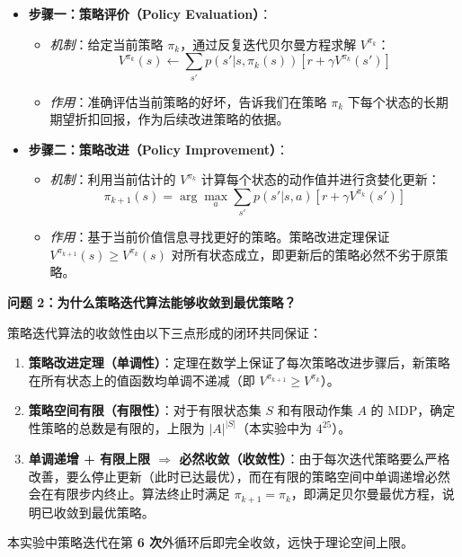 \documentclass[11pt,a4paper,UTF8]{ctexart}
\numberwithin{figure}{section}
\numberwithin{table}{section}
\newcommand{\answerlabel}{%
  \par\smallskip\noindent{\heiti\bfseries 回答：}\quad}
\begin{document}
\begin{itemize}
    \item \textbf{步骤一：策略评价（Policy Evaluation）}：
    \begin{itemize}
        \item \textit{机制}：给定当前策略 $\pi_k$，通过反复迭代贝尔曼方程求解 $V^{\pi_k}$：
        $$V^{\pi_k}(s) \leftarrow \sum_{s'} p(s'|s,\pi_k(s))[r + \gamma V^{\pi_k}(s')]$$
        \item \textit{作用}：准确评估当前策略的好坏，告诉我们在策略 $\pi_k$ 下每个状态的长期期望折扣回报，作为后续改进策略的依据。
    \end{itemize}
    \item \textbf{步骤二：策略改进（Policy Improvement）}：
    \begin{itemize}
        \item \textit{机制}：利用当前估计的 $V^{\pi_k}$ 计算每个状态的动作值并进行贪婪化更新：
        $$\pi_{k+1}(s) = \arg\max_a \sum_{s'} p(s'|s,a)[r + \gamma V^{\pi_k}(s')]$$
        \item \textit{作用}：基于当前价值信息寻找更好的策略。策略改进定理保证 $V^{\pi_{k+1}}(s) \geq V^{\pi_k}(s)$ 对所有状态成立，即更新后的策略必然不劣于原策略。
    \end{itemize}
\end{itemize}


\textbf{问题 2：为什么策略迭代算法能够收敛到最优策略？}


\answerlabel 

策略迭代算法的收敛性由以下三点形成的闭环共同保证：

\begin{enumerate}
    \item \textbf{策略改进定理（单调性）}：定理在数学上保证了每次策略改进步骤后，新策略在所有状态上的值函数均单调不递减（即 $V^{\pi_{k+1}} \geq V^{\pi_k}$）。
    \item \textbf{策略空间有限（有限性）}：对于有限状态集 $S$ 和有限动作集 $A$ 的 MDP，确定性策略的总数是有限的，上限为 $|A|^{|S|}$（本实验中为 $4^{25}$）。
    \item \textbf{单调递增 + 有限上限 $\Rightarrow$ 必然收敛（收敛性）}：由于每次迭代策略要么严格改善，要么停止更新（此时已达最优），而在有限的策略空间中单调递增必然会在有限步内终止。算法终止时满足 $\pi_{k+1} = \pi_k$，即满足贝尔曼最优方程，说明已收敛到最优策略。
\end{enumerate}

本实验中策略迭代在第 \textbf{6 次}外循环后即完全收敛，远快于理论空间上限。
\end{document}
